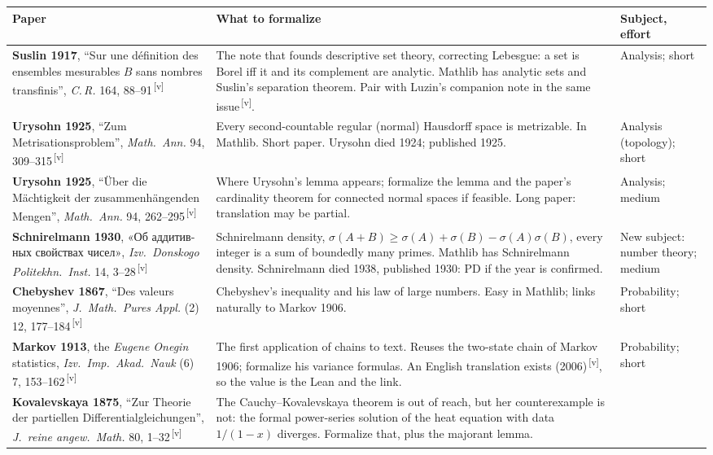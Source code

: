 \documentclass[11pt]{article}
\newcommand{\ru}[1]{\foreignlanguage{russian}{#1}}
\newcommand{\verify}{\textsuperscript{\color{gray}\,[v]}}
\begin{document}
\medskip
\begin{tabularx}{\linewidth}{@{}p{4.3cm} Y p{3.1cm}@{}}
\toprule
Paper & What to formalize & Subject, effort \\
\midrule
\textbf{Suslin 1917}, ``Sur une définition des ensembles mesurables $B$ sans nombres transfinis'', \emph{C.\,R.} 164, 88--91\verify &
The note that founds descriptive set theory, correcting Lebesgue: a set is Borel iff it and its complement are analytic. Mathlib has analytic sets and Suslin's separation theorem. Pair with Luzin's companion note in the same issue\verify. &
Analysis; short \\
\textbf{Urysohn 1925}, ``Zum Metrisationsproblem'', \emph{Math.\ Ann.} 94, 309--315\verify &
Every second-countable regular (normal) Hausdorff space is metrizable. In Mathlib. Short paper. Urysohn died 1924; published 1925. &
Analysis (topology); short \\
\textbf{Urysohn 1925}, ``Über die Mächtigkeit der zusammenhängenden Mengen'', \emph{Math.\ Ann.} 94, 262--295\verify &
Where Urysohn's lemma appears; formalize the lemma and the paper's cardinality theorem for connected normal spaces if feasible. Long paper: translation may be partial. &
Analysis; medium \\
\textbf{Schnirelmann 1930}, \ru{«Об аддитивных свойствах чисел»}, \emph{Izv.\ Donskogo Politekhn.\ Inst.} 14, 3--28\verify &
Schnirelmann density, $\sigma(A+B)\ge\sigma(A)+\sigma(B)-\sigma(A)\sigma(B)$, every integer is a sum of boundedly many primes. Mathlib has Schnirelmann density. Schnirelmann died 1938, published 1930: PD if the year is confirmed. &
New subject: number theory; medium \\
\textbf{Chebyshev 1867}, ``Des valeurs moyennes'', \emph{J.\ Math.\ Pures Appl.} (2) 12, 177--184\verify &
Chebyshev's inequality and his law of large numbers. Easy in Mathlib; links naturally to Markov 1906. &
Probability; short \\
\textbf{Markov 1913}, the \emph{Eugene Onegin} statistics, \emph{Izv.\ Imp.\ Akad.\ Nauk} (6) 7, 153--162\verify &
The first application of chains to text. Reuses the two-state chain of Markov 1906; formalize his variance formulas. An English translation exists (2006)\verify, so the value is the Lean and the link. &
Probability; short \\
\textbf{Kovalevskaya 1875}, ``Zur Theorie der partiellen Differentialgleichungen'', \emph{J.\ reine angew.\ Math.} 80, 1--32\verify &
The Cauchy--Kovalevskaya theorem is out of reach, but her counterexample is not: the formal power-series solution of the heat equation with data $1/(1-x)$ diverges. Formalize that, plus the majorant lemma. &

\end{tabularx}
\end{document}
